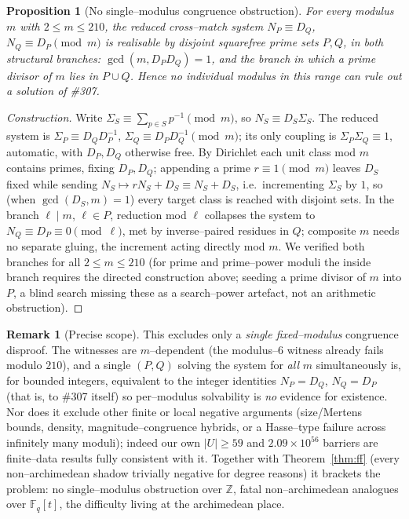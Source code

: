 \documentclass[11pt]{article}
\newtheorem{proposition}[theorem]{Proposition}
\theoremstyle{definition}
\newtheorem{remark}[theorem]{Remark}
\begin{document}
\begin{proposition}[No single--modulus congruence obstruction]\label{prop:nolocal}
For every modulus $m$ with $2\le m\le210$, the reduced cross--match system $N_P\equiv D_Q$,
$N_Q\equiv D_P\pmod m$ is realisable by disjoint squarefree prime sets $P,Q$, in both structural
branches: $\gcd(m,D_PD_Q)=1$, and the branch in which a prime divisor of $m$ lies in $P\cup Q$. Hence
no individual modulus in this range can rule out a solution of \#307.
\end{proposition}
\begin{proof}[Construction]
Write $\Sigma_S\equiv\sum_{p\in S}p^{-1}\pmod m$, so $N_S\equiv D_S\Sigma_S$. The reduced system is
$\Sigma_P\equiv D_Q D_P^{-1}$, $\Sigma_Q\equiv D_P D_Q^{-1}\pmod m$; its only coupling is
$\Sigma_P\Sigma_Q\equiv1$, automatic, with $D_P,D_Q$ otherwise free. By Dirichlet each unit class mod
$m$ contains primes, fixing $D_P,D_Q$; appending a prime $r\equiv1\pmod m$ leaves $D_S$ fixed while
sending $N_S\mapsto rN_S+D_S\equiv N_S+D_S$, i.e.\ incrementing $\Sigma_S$ by $1$, so (when
$\gcd(D_S,m)=1$) every target class is reached with disjoint sets. In the branch $\ell\mid m$,
$\ell\in P$, reduction mod $\ell$ collapses the system to $N_Q\equiv D_P\equiv0\pmod\ell$, met by
inverse--paired residues in $Q$; composite $m$ needs no separate gluing, the increment acting directly
mod $m$. We verified both branches for all $2\le m\le210$ (for prime and prime--power moduli the
inside branch requires the directed construction above; seeding a prime divisor of $m$ into $P$,
a blind search missing these as a search--power artefact, not an arithmetic obstruction).
\end{proof}
\begin{remark}[Precise scope]
This excludes only a \emph{single fixed--modulus} congruence disproof. The witnesses are
$m$--dependent (the modulus--$6$ witness already fails modulo $210$), and a single $(P,Q)$ solving the
system for \emph{all} $m$ simultaneously is, for bounded integers, equivalent to the integer identities
$N_P=D_Q$, $N_Q=D_P$ (that is, to \#307 itself) so per--modulus solvability is \emph{no} evidence
for existence. Nor does it exclude other finite or local negative arguments (size/Mertens bounds,
density, magnitude--congruence hybrids, or a Hasse--type failure across infinitely many moduli);
indeed our own $|U|\ge59$ and $2.09\times10^{56}$ barriers are finite--data results fully consistent
with it. Together with Theorem~\ref{thm:ff} (every non--archimedean shadow trivially negative for
degree reasons) it brackets the problem: no single--modulus obstruction over $\mathbb{Z}$, fatal
non--archimedean analogues over $\mathbb{F}_q[t]$, the difficulty living at the archimedean place.
\end{remark}
\end{document}
